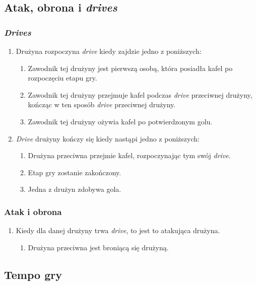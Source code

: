 \documentclass[11pt,a4paper]{article}
\begin{document}
\subsection{Atak, obrona i \emph{drives}}

\subsubsection{\emph{Drives}}
\begin{enumerate}
  \item Drużyna rozpoczyna \emph{drive} kiedy zajdzie jedno z poniższych:
  \begin{enumerate}
    \item Zawodnik tej drużyny jest pierwszą osobą, która posiadła kafel po rozpoczęciu etapu gry.
    \item Zawodnik tej drużyny przejmuje kafel podczas \emph{drive} przeciwnej drużyny, kończąc w ten sposób \emph{drive} przeciwnej drużyny.
    \item Zawodnik tej drużyny ożywia kafel po potwierdzonym golu.
  \end{enumerate}
  \item \emph{Drive} drużyny kończy się kiedy nastąpi jedno z poniższych:
  \begin{enumerate}
    \item Drużyna przeciwna przejmie kafel, rozpoczynając tym swój \emph{drive}.
    \item Etap gry zostanie zakończony.
    \item Jedna z drużyn zdobywa gola.
  \end{enumerate}
\end{enumerate}

\subsubsection{Atak i obrona}
\begin{enumerate}
  \item Kiedy dla danej drużyny trwa \emph{drive}, to jest to atakująca drużyna.
  \begin{enumerate}
    \item Drużyna przeciwna jest broniącą się drużyną.
  \end{enumerate}
\end{enumerate}

\subsection{Tempo gry}
\end{document}
